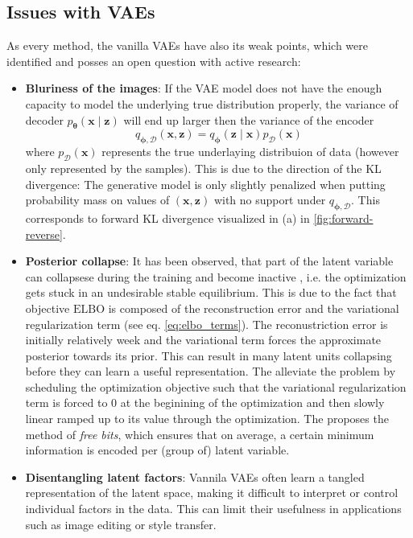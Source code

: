 \subsection{Issues with VAEs}
As every method, the vanilla VAEs have also its weak points, which were identified and posses an open question with active research:
\begin{itemize}
    \item \textbf{Bluriness of the images}: If the VAE model does not have the enough capacity to model the underlying true distribution properly,
    the variance of decoder $p_{\boldsymbol{\theta}}(\boldsymbol{x}\mid \boldsymbol{z})$ will end up larger then the variance of the encoder 
    $$
    q_{\mathbf{\phi},\mathcal{D}}(\boldsymbol{x},\boldsymbol{z}) = q_{\boldsymbol{\phi}}(\mathbf{z}\mid\mathbf{x})p_{\mathcal{D}}(\mathbf{x})
    $$
    where $p_{\mathcal{D}}(\mathbf{x})$ represents the true underlaying distribuion of data (however only represented by the samples).
    This is due to the direction of the KL divergence: The generative model is only slightly penalized when putting probability mass on values 
    of $(\boldsymbol{x},\boldsymbol{z})$ with no support under $q_{\mathbf{\phi},\mathcal{D}}$\cite{intro-vae-2019}. This corresponds to forward KL
    divergence visualized in (a) in \ref{fig:forward-reverse}. \label{item:blurriness-of-img}

    \item \textbf{Posterior collapse}: It has been observed, that part of the latent variable can collapsese during the training
    and become inactive \cite{lvae-2016,iaf-2016,bowmann-2016}, i.e. the optimization gets stuck in an undesirable stable
    equilibrium. This is due to the fact that objective $\mathrm{ELBO}$ is composed of the reconstruction error
    and the variational regularization term (see eq. \ref{eq:elbo_terms}). The reconustriction error is initially relatively week and 
    the variational term forces the approximate posterior towards its prior. This can result in many latent units collapsing before they 
    can learn a useful representation. 
    The \cite{lvae-2016} alleviate the problem by scheduling the optimization objective such that the variational regularization term is
    forced to 0 at the beginining of the optimization and then slowly linear ramped up to its value through the optimization. The \cite{iaf-2016} 
    proposes the method of \textit{free bits}, which ensures that on average, a certain minimum information is encoded per (group of) 
    latent variable. 
    \item \textbf{Disentangling latent factors}: Vannila VAEs often learn a tangled representation of the latent space, making it
    difficult to interpret or control individual factors in the data. This can limit their usefulness in applications such as 
    image editing or style transfer.
\end{itemize}

